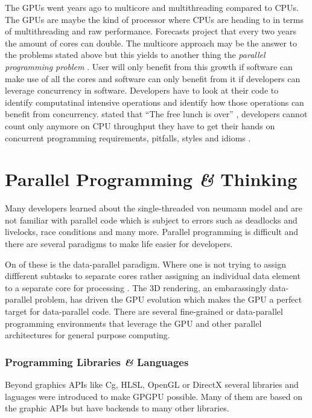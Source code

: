 The \glspl{GPU} went years ago to multicore and multithreading compared to
\glspl{CPU}. The \glspl{GPU} are maybe the kind of processor where \glspl{CPU}
are heading to in terms of multithreading and raw performance. Forecasts project
that every two years the amount of cores can double. The multicore approach may
be the answer to the problems stated above but this yields to another thing the
\emph{parallel programming problem} \citep{citeulike:3750573}. User will only
benefit from this growth if software can make use of all the cores and software
can only benefit from it if developers can leverage concurrency in software.
Developers have to look at their code to identify computatinal intensive
operations and identify how those operations can benefit from concurrency.
\citep{citeulike:6643735} stated that ``The free
lunch is over'' , developers cannot count only anymore on \gls{CPU} throughput
they have to get their hands on concurrent programming requirements, pitfalls,
styles and idioms \citep{citeulike:6643735}.


\section{Parallel Programming \textit{\&} Thinking} %
\label{sec:parallel_programming__thinking}

Many developers learned about the single-threaded von neumann model and are not
familiar with parallel code which is subject to errors such as deadlocks and
livelocks, race conditions and many more. Parallel programming is difficult and
there are several paradigms to make life easier for developers.

On of these is the data-parallel paradigm. Where one is not trying to assign
diffferent subtasks to separate cores rather assigning an individual data
element to a separate core for processing \citep{citeulike:3750565}. The
\gls{3D} rendering, an embarassingly data-parallel problem, has driven the
\gls{GPU} evolution which makes the \gls{GPU} a perfect target for data-parallel
code. There are several fine-grained or data-parallel programming environments
that leverage the \gls{GPU} and other parallel architectures for general purpose
computing.

\subsubsection{Programming Libraries {\textit{\&}} Languages} %
\label{ssub:programming_libraries_and_languages}
Beyond graphics \glspl{API} like Cg, \gls{HLSL}, OpenGL or DirectX several 
libraries and laguages were introduced to make \gls{GPGPU} possible. Many of them
are based on the graphic \glspl{API} but have backends to many other libraries. 

